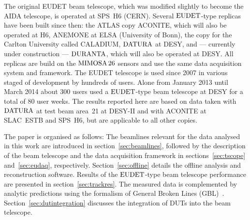 The original EUDET beam telescope, which was modified slightly to become the AIDA telescope, is operated at SPS~H6 (CERN).
Several $\textrm{EUDET}$-type replicas have been built since then:
 the ATLAS copy ACONITE, which will also be operated at H6, ANEMONE at ELSA (University of Bonn), the copy for the Carlton University called CALADIUM, 
 $\textrm{DATURA}$ at DESY, and --- currently under construction --- $\textrm{DURANTA}$, which will also be operated at DESY. 
All replicas are build on the $\textrm{MIMOSA\,26}$ sensors and use the same data acquisition system and framework. 
The EUDET telescope is used since 2007 in various staged of development by hundreds of users. 
Alone from January 2013 until March 2014 about 300 users used a $\textrm{EUDET}$-type beam telescope at DESY for a total of 80 user weeks. 
The results reported here are based on data taken with $\textrm{DATURA}$ at test beam area~21 at {DESY-II} and with ACONITE at SLAC~ESTB and SPS~H6, but are applicable to all other copies. 


The paper is organised as follows: 
The beamlines relevant for the data analysed in this work are introduced in section~\ref{sec:beamlines}, followed by the description of the beam telescope
 and the data acquisition framework in sections~\ref{sec:tscope} and~\ref{sec:eudaq}, respectively.
Section~\ref{sec:offline} details the offline analysis and reconstruction software. 
Results of the $\textrm{EUDET}$-type beam telescope performance are presented in section~\ref{sec:trackres}. %
The measured data is complemented by analytic predictions using the formalism of General Broken Lines (GBL)~\cite{Blobel20111760,Kleinwort-2012}.
Section~\ref{sec:dutintegration} discusses the integration of DUTs into the beam telescope. 
